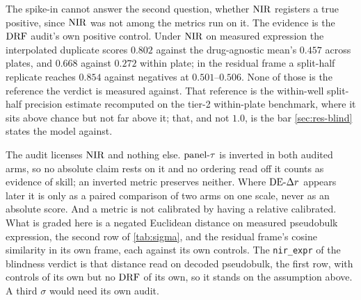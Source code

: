 The spike-in cannot answer the second question, whether $\textrm{NIR}$ registers a true
positive, since $\textrm{NIR}$ was not among the metrics run on it. The evidence is the
$\textrm{DRF}$ audit's own positive control. Under $\textrm{NIR}$ on measured expression the
interpolated
duplicate scores $0.802$ against the drug-agnostic mean's $0.457$ across plates,
and $0.668$ against $0.272$ within plate; in the residual frame a split-half
replicate reaches $0.854$ against negatives at $0.501$--$0.506$. None of those is
the reference the verdict is measured against. That reference is the within-well
split-half precision estimate recomputed on the tier-2 within-plate benchmark,
where it sits above chance but not far above it; that, and not $1.0$, is the bar
\cref{sec:res-blind} states the model against.

\begin{scopelimit}
The audit licenses $\textrm{NIR}$ and nothing else. $\textrm{panel-}\tau$ is inverted in both
audited arms, so no absolute claim rests on it and no ordering read off it counts
as evidence of skill; an inverted metric preserves neither. Where $\textrm{DE-}\Delta r$
appears later it is only as a paired comparison of two arms on one scale, never
as an absolute score. And a metric is not calibrated by having a relative
calibrated. What is graded here is a negated Euclidean distance on measured
pseudobulk expression, the second row of \cref{tab:sigma}, and the residual
frame's cosine similarity in its own frame, each against its own controls. The
\texttt{nir\_expr} of the blindness verdict is that distance read on decoded
pseudobulk, the first row, with controls of its own but no $\textrm{DRF}$ of its own, so
it stands on the assumption above. A third $\sigma$ would need its own audit.
\end{scopelimit}


